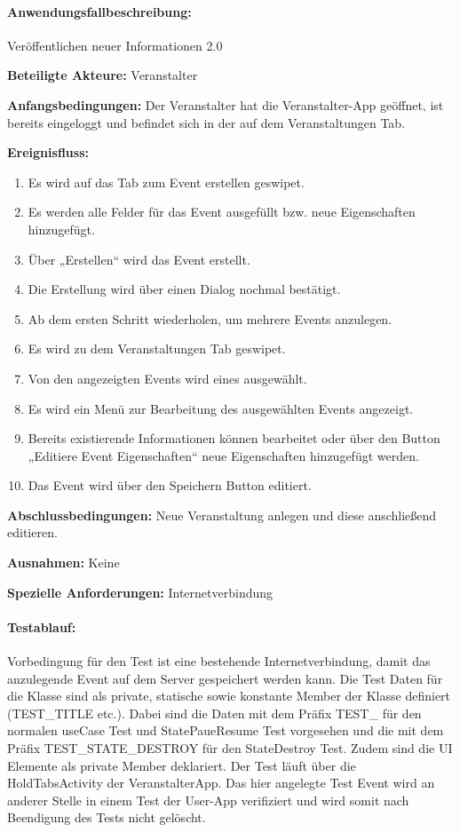 \paragraph{Anwendungsfallbeschreibung:} Veröffentlichen neuer Informationen 2.0

\textbf{Beteiligte Akteure:}
	Veranstalter
	
\textbf{Anfangsbedingungen:}
	Der Veranstalter hat die Veranstalter-App geöffnet, ist bereits eingeloggt und befindet sich in der  auf dem Veranstaltungen Tab.
	
\textbf{Ereignisfluss:}
	\begin{enumerate}
		\item Es wird  auf das Tab zum Event erstellen geswipet.
		\item Es werden alle Felder für das Event ausgefüllt bzw. neue Eigenschaften hinzugefügt.
		\item Über „Erstellen“ wird das Event erstellt.
		\item Die Erstellung wird über einen Dialog nochmal bestätigt.
		\item Ab dem ersten Schritt wiederholen, um mehrere Events anzulegen.
		\item Es wird zu dem Veranstaltungen Tab geswipet.
		\item Von den angezeigten Events wird eines ausgewählt.
		\item Es wird ein Menü zur Bearbeitung des ausgewählten Events angezeigt.
		\item Bereits existierende Informationen können bearbeitet oder über den Button „Editiere Event Eigenschaften“ neue Eigenschaften hinzugefügt werden.
		\item Das Event wird über den Speichern Button editiert.
	\end{enumerate}
	
\textbf{Abschlussbedingungen:}
	Neue Veranstaltung anlegen und diese anschließend editieren.
	
\textbf{Ausnahmen:}
	Keine
	
\textbf{Spezielle Anforderungen:}
	Internetverbindung

\paragraph{Testablauf:}
Vorbedingung für den Test ist eine bestehende Internetverbindung, damit das anzulegende Event auf dem Server gespeichert werden kann.
Die Test Daten für die Klasse sind als private, statische sowie konstante Member der Klasse definiert (TEST\_TITLE etc.). Dabei sind die Daten mit dem Präfix TEST\_ für den normalen useCase Test und StatePaueResume Test vorgesehen und die mit dem Präfix TEST\_STATE\_DESTROY für den StateDestroy Test. Zudem sind die UI Elemente als private Member deklariert.
Der Test läuft über die HoldTabsActivity der \glqq VeranstalterApp\grqq. Das hier angelegte Test Event wird an anderer Stelle in einem Test der User-App   verifiziert und wird somit nach Beendigung des Tests nicht gelöscht.

